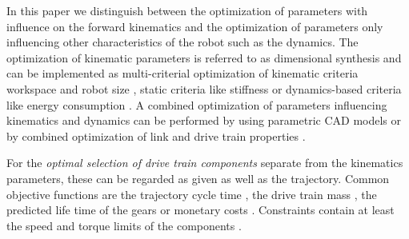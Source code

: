 \documentclass{svproc}
\begin{document}
In this paper we distinguish between the optimization of parameters with influence on the forward kinematics and the optimization of parameters only influencing other characteristics of the robot such as the dynamics.
The optimization of kinematic parameters is referred to as dimensional synthesis and can be implemented as multi-criterial optimization of kinematic criteria workspace and robot size \cite{CeccarelliLan2004}, static criteria like stiffness \cite{CarboneOttCec2007} or dynamics-based criteria like energy consumption \cite{RamirezKotOrt2017}.
A combined optimization of parameters influencing kinematics and dynamics can be performed by using parametric CAD models \cite{TarkianLunOel2008,ZhouBai2015} or by combined optimization of link and drive train properties \cite{ShillerSun1991}.


For the \emph{optimal selection of drive train components} separate from the kinematics parameters, these can be regarded as given as well as the trajectory. %
Common objective functions are the trajectory cycle time \cite{TarkianPerOelFen2011}, the drive train mass \cite{ChedmailGau1990,PetterssonOel2009,ZhouBaiHan2011}, the predicted life time of the gears \cite{PetterssonAndKru2005} or monetary costs \cite{PetterssonAndKru2005}.
Constraints contain at least the speed and torque limits of the components \cite {ChedmailGau1990,PetterssonOel2009,ZhouBaiHan2011}.
\end{document}
